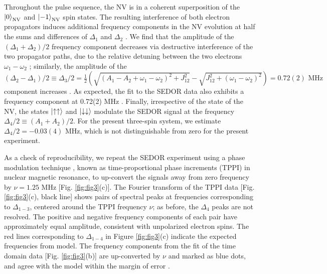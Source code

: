 \documentclass[%
 reprint,
 amsmath,amssymb,
 aps,
]{revtex4-1}
\begin{document}
Throughout the pulse sequence, the NV is in a coherent superposition of the $\ket{0}_{\text{NV}}$ and $\ket{-1}_{\text{NV}}$ spin states. The resulting interference of both electron propagators induces additional frequency components in the NV evolution at half the sums and differences of $\Delta_{1}$ and $\Delta_{2}$ \cite{suppl}. We find that the amplitude of the $(\Delta_{1}+\Delta_{2})/2$ frequency component decreases via destructive interference of the two propagator paths, due to the relative detuning between the two electrons $\omega_1-\omega_2$ \cite{suppl}; similarly, the amplitude of the $(\Delta_{2}-\Delta_{1})/2\equiv\Delta_3/2=\frac{1}{2}(\sqrt{(A_1-A_2+\omega_1-\omega_2)^2+J_{12}^2}-\sqrt{J_{12}^2+(\omega_{1}-\omega_{2})^2})=0.72(2) \text{ MHz}$ component increases \cite{suppl}. As expected, the fit to the SEDOR data also exhibits a frequency component at 0.72(2) MHz \cite{suppl}. Finally, irrespective of the state of the NV, the states $\ket{\uparrow\uparrow}$ and $\ket{\downarrow\downarrow}$ modulate the SEDOR signal at the frequency $\Delta_{4}/2\equiv(A_1+A_2)/2$. For the present three-spin system, we estimate $\Delta_4/2=-0.03(4)\text{ MHz}$, which is not distinguishable from zero for the present experiment.

As a check of reproducibility, we repeat the SEDOR experiment using a phase modulation technique \cite{suppl}, known as time-proportional phase increments (TPPI) in nuclear magnetic resonance, to up-convert the signals away from zero frequency by $\nu=1.25\text{ MHz}$ \cite{schweiger} [Fig. \ref{fig:fig3}(c)]. The Fourier transform of the TPPI data [Fig. \ref{fig:fig3}(c), black line] shows pairs of spectral peaks at frequencies corresponding to $\Delta_{1-3}$, centered around the TPPI frequency $\nu$; as before, the $\Delta_4$ peaks are not resolved. The positive and negative frequency components of each pair have approximately equal amplitude, consistent with unpolarized electron spins. The red lines corresponding to $\Delta_{1-4}$ in Figure \ref{fig:fig3}(c) indicate the expected frequencies from model. The frequency components from the fit of the time domain data [Fig. \ref{fig:fig3}(b)] are up-converted by $\nu$ and marked as blue dots, and agree with the model within the margin of error \cite{suppl}.
\end{document}
